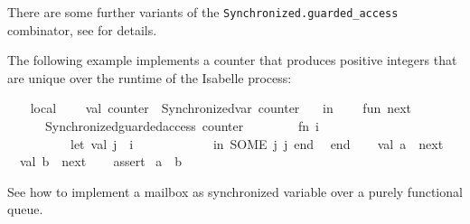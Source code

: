 \begin{isabellebody}
\begin{isamarkuptext}
  There are some further variants of the \verb|Synchronized.guarded_access| combinator, see \hyperlink{file.~~/src/Pure/Concurrent/synchronized.ML}{\mbox{}} for details.%
\end{isamarkuptext}%
\isamarkuptrue%
%
\endisatagmlref
{\isafoldmlref}%
%
\isadelimmlref
%
\endisadelimmlref
%
\isadelimmlex
%
\endisadelimmlex
%
\isatagmlex
%
\begin{isamarkuptext}%
The following example implements a counter that produces
  positive integers that are unique over the runtime of the Isabelle
  process:%
\end{isamarkuptext}%
\isamarkuptrue%
%
\endisatagmlex
{\isafoldmlex}%
%
\isadelimmlex
%
\endisadelimmlex
%
\isadelimML
%
\endisadelimML
%
\isatagML
{}\isamarkupfalse%
\ {\isacharverbatimopen}\isanewline
\ \ local\isanewline
\ \ \ \ val\ counter\ {\isacharequal}\ Synchronized{\isachardot}var\ {\isachardoublequote}counter{\isachardoublequote}\ {}{\isacharsemicolon}\isanewline
\ \ in\isanewline
\ \ \ \ fun\ next\ {\isacharparenleft}{\isacharparenright}\ {\isacharequal}\isanewline
\ \ \ \ \ \ Synchronized{\isachardot}guarded{\isacharunderscore}access\ counter\isanewline
\ \ \ \ \ \ \ \ {\isacharparenleft}fn\ i\ {\isacharequal}{\isachargreater}\isanewline
\ \ \ \ \ \ \ \ \ \ let\ val\ j\ {\isacharequal}\ i\ {\isacharplus}\ {}\isanewline
\ \ \ \ \ \ \ \ \ \ in\ SOME\ {\isacharparenleft}j{\isacharcomma}\ j{\isacharparenright}\ end{\isacharparenright}{\isacharsemicolon}\isanewline
\ \ end{\isacharsemicolon}\isanewline
{\isacharverbatimclose}\isanewline
\isanewline
{}\isamarkupfalse%
\ {\isacharverbatimopen}\isanewline
\ \ val\ a\ {\isacharequal}\ next\ {\isacharparenleft}{\isacharparenright}{\isacharsemicolon}\isanewline
\ \ val\ b\ {\isacharequal}\ next\ {\isacharparenleft}{\isacharparenright}{\isacharsemicolon}\isanewline
\ \ %
\isaantiq
assert%
\endisaantiq
\ {\isacharparenleft}a\ {\isacharless}{\isachargreater}\ b{\isacharparenright}{\isacharsemicolon}\isanewline
{\isacharverbatimclose}%
\endisatagML
{\isafoldML}%
%
\isadelimML
%
\endisadelimML
%
\begin{isamarkuptext}%
\medskip See \hyperlink{file.~~/src/Pure/Concurrent/mailbox.ML}{\mbox{}} how
  to implement a mailbox as synchronized variable over a purely
  functional queue.%
\end{isamarkuptext}%
\isamarkuptrue%
%
\isadelimtheory
%
\endisadelimtheory
%
\isatagtheory
{}\isamarkupfalse%
%
\endisatagtheory
{\isafoldtheory}%
%
\isadelimtheory
%
\endisadelimtheory
\end{isabellebody}%
